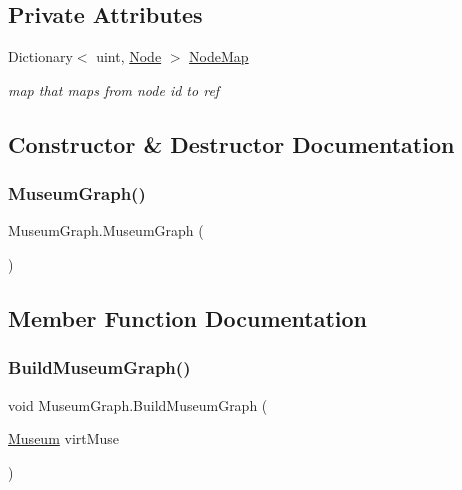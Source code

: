 \subsection*{Private Attributes}
\begin{DoxyCompactItemize}
\item 
Dictionary$<$ uint, \mbox{\hyperlink{class_museum_graph_1_1_node}{Node}} $>$ \mbox{\hyperlink{class_museum_graph_a79484680da9ead2da6cca2a8225458e5}{Node\+Map}}
\begin{DoxyCompactList}\small\item\em map that maps from node id to ref \end{DoxyCompactList}\end{DoxyCompactItemize}


\subsection{Constructor \& Destructor Documentation}
\mbox{\label{class_museum_graph_a36c6cda2e0045c0d501e6c1c5dc286bf}} 
\subsubsection{\texorpdfstring{Museum\+Graph()}{MuseumGraph()}}
{\footnotesize\ttfamily Museum\+Graph.\+Museum\+Graph (\begin{DoxyParamCaption}{ }\end{DoxyParamCaption})}



\subsection{Member Function Documentation}
\mbox{\label{class_museum_graph_a36a26248bb9c304f8e67c60eb6d517f5}} 
\subsubsection{\texorpdfstring{Build\+Museum\+Graph()}{BuildMuseumGraph()}}
{\footnotesize\ttfamily void Museum\+Graph.\+Build\+Museum\+Graph (\begin{DoxyParamCaption}\item[{\mbox{\hyperlink{class_museum}{Museum}}}]{virt\+Muse }\end{DoxyParamCaption})}



